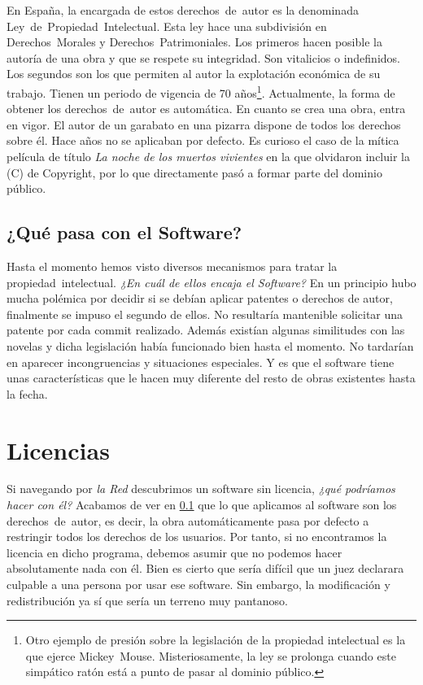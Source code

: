 En España, la encargada de estos derechos~de~autor es la denominada
Ley~de~Propiedad~Intelectual. Esta ley hace una subdivisión en
Derechos~Morales y Derechos~Patrimoniales. Los primeros hacen posible
la autoría de una obra y que se respete su integridad. Son vitalicios
o indefinidos. Los segundos son los que permiten al autor la
explotación económica de su trabajo. Tienen un periodo de vigencia de
70 años\footnote{Otro ejemplo de presión sobre la legislación de la
  propiedad intelectual es la que ejerce
  Mickey~Mouse. Misteriosamente, la ley se prolonga cuando este
  simpático ratón está a punto de pasar al dominio
  público.}. Actualmente, la forma de obtener los derechos~de~autor es
automática. En cuanto se crea una obra, entra en vigor. El autor de un
garabato en una pizarra dispone de todos los derechos sobre él. Hace
años no se aplicaban por defecto. Es curioso el caso de la mítica
película de título \emph{La noche de los muertos vivientes} en la que
olvidaron incluir la (C) de Copyright, por lo que directamente pasó a
formar parte del dominio público.

\subsection{¿Qué pasa con el Software?}
\label{sub:que_pasa}
Hasta el momento hemos visto diversos mecanismos para tratar la
propiedad~intelectual. \emph{¿En cuál de ellos encaja el Software?} En
un principio hubo mucha polémica por decidir si se debían aplicar
patentes o derechos de autor, finalmente se impuso el segundo de
ellos. No resultaría mantenible solicitar una patente por cada commit
realizado. Además existían algunas similitudes con las novelas y dicha
legislación había funcionado bien hasta el momento. No tardarían en
aparecer incongruencias y situaciones especiales. Y es que el software
tiene unas características que le hacen muy diferente del resto de
obras existentes hasta la fecha.

\section{Licencias}


Si navegando por \emph{la Red} descubrimos un software sin licencia,
\emph{¿qué podríamos hacer con él?} Acabamos de ver en
\ref{sub:que_pasa} que lo que aplicamos al software son los
derechos~de~autor, es decir, la obra automáticamente pasa por defecto
a restringir todos los derechos de los usuarios. Por tanto, si no
encontramos la licencia en dicho programa, debemos asumir que no
podemos hacer absolutamente nada con él. Bien es cierto que sería
difícil que un juez declarara culpable a una persona por usar ese
software. Sin embargo, la modificación y redistribución ya sí que
sería un terreno muy pantanoso.

